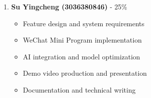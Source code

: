 \begin{enumerate}
    \item \textbf{Su Yingcheng (3036380846)} - 25\%
    \begin{itemize}
        \item Feature design and system requirements
        \item WeChat Mini Program implementation
        \item AI integration and model optimization
        \item Demo video production and presentation
        \item Documentation and technical writing
    \end{itemize}
\end{enumerate} 
